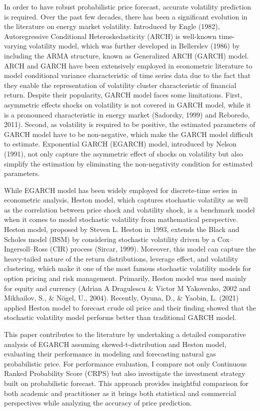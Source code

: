 \documentclass[12pt,a4paper]{article}
\numberwithin{equation}{section}
\begin{document}
In order to have robust probabilistic price forecast, accurate volatility prediction is required. Over the past few decades, there has been a significant evolution in the literature on energy market volatility. Introduced by Engle (1982), Autoregressive Conditional Heteroskedasticity (ARCH) is well-known time-varying volatility model, which was further developed in Bellerslev (1986) by including the ARMA structure, known as Generalized ARCH (GARCH) model. ARCH and GARCH have been extensively employed in econometric literature to model conditional variance characteristic of time series data due to the fact that they enable the representation of volatility cluster characteristic of financial return. Despite their popularity, GARCH model faces some limitations. First, asymmetric effects shocks on volatility is not covered in GARCH model, while it is a pronounced characteristic in energy market (Sadorsky, 1999) and Reboredo, 2011). Second, as volatility is required to be positive, the estimated parameters of GARCH model have to be non-negative, which make the GARCH model difficult to estimate. Exponential GARCH (EGARCH) model, introduced by Nelson (1991), not only capture the asymmetric effect of shocks on volatility but also simplify the estimation by eliminating the non-negativity condition for estimated parameters. 

While EGARCH model has been widely employed for discrete-time series in econometric analysis, Heston model, which captures stochastic volatility as well as the correlation between price shock and volatility shock, is a benchmark model when it comes to model stochastic volatility from mathematical perspective. Heston model, proposed by Steven L. Heston in 1993, extends the Black and Scholes model (BSM) by considering stochastic volatility driven by a Cox–Ingersoll–Ross (CIR) process (Sircar, 1999). Moreover, this model can capture the heavy-tailed nature of the return distributions, leverage effect, and volatility clustering, which make it one of the most famous stochastic volatility models for option pricing and risk management. Primarily, Heston model was used mainly for equity and currency (Adrian A Dragulescu \& Victor M Yakovenko, 2002 and Mikhailov, S., \& Nögel, U., 2004). Recently, Oyuna, D., \& Yaobin, L. (2021) applied Heston model to forecast crude oil price and their finding showed that the stochastic volatility model performs better than traditional GARCH model. 

This paper contributes to the literature by undertaking a detailed comparative analysis of EGARCH assuming skewed-t-distribution and Heston model, evaluating their performance in modeling and forecasting natural gas probabilistic price. For performance evaluation, I compare not only Continuous Ranked Probability Score (CRPS) but also investigate the investment strategy built on probabilistic forecast. This approach provides insightful comparison for both academic and practitioner as it brings both statistical and commercial perspectives while analyzing the accuracy of price prediction.
\end{document}
